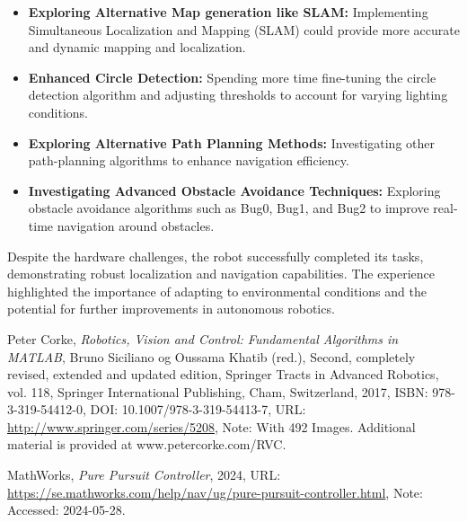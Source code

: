 \documentclass{article}
\begin{document}
	\begin{itemize}
		\item \textbf{Exploring Alternative Map generation like SLAM:} Implementing Simultaneous Localization and Mapping (SLAM) could provide more accurate and dynamic mapping and localization.
		\item \textbf{Enhanced Circle Detection:} Spending more time fine-tuning the circle detection algorithm and adjusting thresholds to account for varying lighting conditions.
		\item \textbf{Exploring Alternative Path Planning Methods:} Investigating other path-planning algorithms to enhance navigation efficiency.
		\item \textbf{Investigating Advanced Obstacle Avoidance Techniques:} Exploring obstacle avoidance algorithms such as Bug0, Bug1, and Bug2 to improve real-time navigation around obstacles.
	\end{itemize}

	Despite the hardware challenges, the robot successfully completed its tasks, demonstrating robust localization and navigation capabilities. The experience highlighted the importance of adapting to environmental conditions and the potential for further improvements in autonomous robotics.
	\clearpage
	\begin{thebibliography}{9}
		
		Peter Corke,
		\textit{Robotics, Vision and Control: Fundamental Algorithms in MATLAB},
		Bruno Siciliano og Oussama Khatib (red.),
		Second, completely revised, extended and updated edition,
		Springer Tracts in Advanced Robotics, vol. 118,
		Springer International Publishing, Cham, Switzerland,
		2017,
		ISBN: 978-3-319-54412-0,
		DOI: 10.1007/978-3-319-54413-7,
		URL: \url{http://www.springer.com/series/5208},
		Note: With 492 Images. Additional material is provided at www.petercorke.com/RVC.
		
		MathWorks,
		\textit{Pure Pursuit Controller},
		2024,
		URL: \url{https://se.mathworks.com/help/nav/ug/pure-pursuit-controller.html},
		Note: Accessed: 2024-05-28.
		
	\end{thebibliography}

	\appendix
\end{document}

